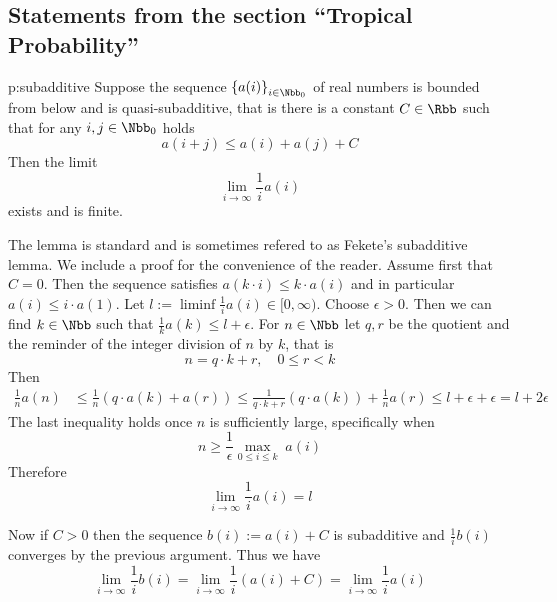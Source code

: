 \def\thesubsection{\thesection.\ref{s:tropical}}
\subsection{Statements from the section ``Tropical Probability''}
\begin{tlemma}{p:subadditive}
  Suppose the sequence $\set{a(i)}_{i\in\Nbb_{0}}$ of  real numbers is
  bounded from below and is
  quasi-subadditive, that is there is a constant $C\in\Rbb$ such that
  for any $i,j\in\Nbb_{0}$ holds
  \[
  a(i+j)\leq a(i) + a(j) + C
  \]
  Then the limit
  \[
  \lim_{i\to\infty}\frac1i a(i)
  \]
  exists and is finite.
\end{tlemma}

\begin{Proof}
  The lemma is standard and is sometimes refered to as Fekete's subadditive lemma. We include a proof for the convenience of the reader.
  Assume first that $C=0$.  Then the sequence satisfies $a(k\cdot
  i)\leq k\cdot a(i)$ and in particular $a(i)\leq i\cdot a(1)$.  Let
  $l:=\liminf\frac1i a(i)\in[0,\infty)$.  Choose $\epsilon>0$. Then we can
  find $k\in\Nbb$ such that $\frac1k a(k)\leq l+\epsilon$.  For
  $n\in\Nbb$ let $q,r$ be the quotient and the reminder of the integer
  division of $n$ by $k$, that is
  \[
  n=q\cdot k+r,\quad0\leq r<k
  \]
  Then
  \begin{align*}
    \frac1n a(n)
    &\leq
    \frac1n (q\cdot a(k)+a(r))
    \leq
    \frac1{q\cdot k+r}(q\cdot a(k))+
    \frac1n a(r)
    \leq
    l+\epsilon+\epsilon=l+2\epsilon
  \end{align*}
  The last inequality holds once $n$ is sufficiently large, specifically when
  \[
  n\geq\frac1\epsilon\max_{0\leq i\leq k}\;a(i)
  \]
  Therefore 
  \[
  \lim_{i \to \infty}\frac1i a(i)=l
  \]
  
  Now if $C>0$ then the sequence $b(i):=a(i)+C$ is subadditive and $\frac1i b(i)$
  converges by the previous argument. Thus we have
  \[
  \lim_{i \to \infty} \frac1i b(i)=\lim_{i \to \infty}\frac1i (a(i)+C)=\lim_{i \to \infty}\frac1i a(i)
  \]
\end{Proof}


